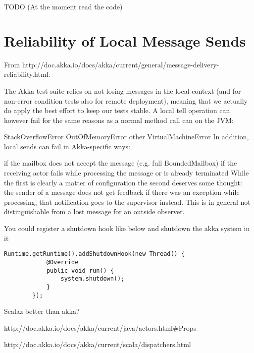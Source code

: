 \documentclass{../llncs}
\begin{document}
TODO (At the moment read the code)

\section{Reliability of Local Message Sends}
From http://doc.akka.io/docs/akka/current/general/message-delivery-reliability.html.

The Akka test suite relies on not losing messages in the local context (and for non-error condition tests also for remote deployment), meaning that we actually do apply the best effort to keep our tests stable. A local tell operation can however fail for the same reasons as a normal method call can on the JVM:

StackOverflowError
OutOfMemoryError
other VirtualMachineError
In addition, local sends can fail in Akka-specific ways:

if the mailbox does not accept the message (e.g. full BoundedMailbox)
if the receiving actor fails while processing the message or is already terminated
While the first is clearly a matter of configuration the second deserves some thought: the sender of a message does not get feedback if there was an exception while processing, that notification goes to the supervisor instead. This is in general not distinguishable from a lost message for an outside observer.

You could register a shutdown hook like below and shutdown the akka system in it
\begin{verbatim}
Runtime.getRuntime().addShutdownHook(new Thread() {
            @Override
            public void run() {
                system.shutdown();
            }
        });
\end{verbatim}

Scalaz better than akka?

http://doc.akka.io/docs/akka/current/java/actors.html#Props

http://doc.akka.io/docs/akka/current/scala/dispatchers.html

\appendix



\end{document}
